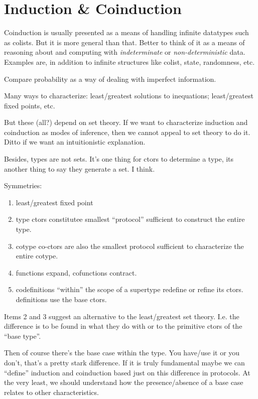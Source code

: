 \section{Induction \& Coinduction}\label{sec:coinduction}

Coinduction is usually presented as a means of handling infinite
datatypes such as colists. But it is more general than that. Better to
think of it as a means of reasoning about and computing with
\textit{indeterminate} or \textit{non-deterministic} data. Examples
are, in addition to infinite structures like colist, state,
randomness, etc.

Compare probability as a way of dealing with imperfect information.

Many ways to characterize: least/greatest solutions to inequations;
least/greatest fixed points, etc.

But these (all?) depend on set theory. If we want to characterize
induction and coinduction as modes of inference, then we cannot appeal
to set theory to do it. Ditto if we want an intuitionistic
explanation.

Besides, types are not sets. It's one thing for ctors to determine a
type, its another thing to say they generate a set. I think.

Symmetries:


\begin{enumerate}
\item least/greatest fixed point
\item type ctors constitutee smallest ``protocol'' sufficient to
  construct the entire type.
\item cotype co-ctors are also the smallest protocol sufficient to
  characterize the entire cotype.
\item functions expand, cofunctions contract.
\item codefinitions ``within'' the scope of a supertype redefine or
  refine its ctors. definitions use the base ctors.
\end{enumerate}

Items 2 and 3 suggest an alternative to the least/greatest set theory.
I.e. the difference is to be found in what they do with or to the
primitive ctors of the ``base type''.

Then of course there's the base case within the type. You have/use it
or you don't, that's a pretty stark difference. If it is truly
fundamental maybe we can ``define'' induction and coinduction based
just on this difference in protocols. At the very least, we should
understand how the presence/absence of a base case relates to other
characteristics.

